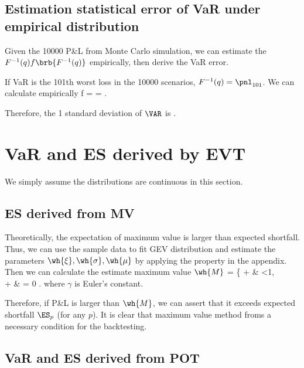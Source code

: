 \subsection{Estimation statistical error of VaR under empirical distribution}

Given the 10000 P\&L from Monte Carlo simulation, we can estimate the $F^{-1}(q)f\brb{F^{-1}(q)}$ empirically, then derive the VaR error.

If VaR is the 101th worst loss in the 10000 scenarios, $F^{-1}(q)= \pnl_{101}$. We can calculate empirically
\be
f =  = .
\ee

Therefore, the 1 standard deviation of $\VAR$ is
\be
{} \approx {} \approx {}   \cdot {}.
\ee


\section{VaR and ES derived by EVT}

We simply assume the distributions are continuous in this section.

\subsection{ES derived from MV}

Theoretically, the expectation of maximum value is larger than expected shortfall. Thus, we can use the sample data to fit GEV distribution and estimate the parameters $\wh{\xi},\wh{\sigma},\wh{\mu}$ by applying the property in the appendix. Then we can calculate the estimate maximum value $\wh{M}$
\be
{} = \left\{
\wh{\mu} + \wh{\sigma} \quad\quad & \wh{\xi} <1,\wh{\xi} \\
\wh{\mu} + \wh{\sigma} \gamma & \wh{\xi} = 0
\ea\right.
\ee
where $\gamma$ is Euler's constant.

Therefore, if P\&L is larger than $\wh{M}$, we can assert that it exceeds expected shortfall $\ES_p$ (for any $p$). It is clear that maximum value method froms a necessary condition for the backtesting.

\subsection{VaR and ES derived from POT}

